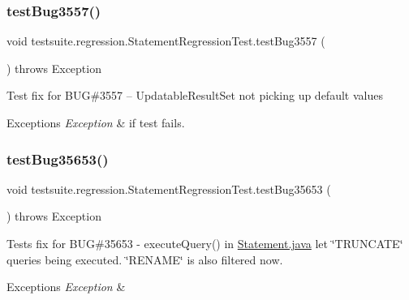 \subsubsection{\texorpdfstring{test\+Bug3557()}{testBug3557()}}
{\footnotesize\ttfamily void testsuite.\+regression.\+Statement\+Regression\+Test.\+test\+Bug3557 (\begin{DoxyParamCaption}{ }\end{DoxyParamCaption}) throws Exception}

Test fix for B\+UG\#3557 -- Updatable\+Result\+Set not picking up default values


\begin{DoxyExceptions}{Exceptions}
{\em Exception} & if test fails. \\
\hline
\end{DoxyExceptions}
\mbox{\label{classtestsuite_1_1regression_1_1_statement_regression_test_a40b2d7e9258863dc6ad385628b08e04d}} 
\subsubsection{\texorpdfstring{test\+Bug35653()}{testBug35653()}}
{\footnotesize\ttfamily void testsuite.\+regression.\+Statement\+Regression\+Test.\+test\+Bug35653 (\begin{DoxyParamCaption}{ }\end{DoxyParamCaption}) throws Exception}

Tests fix for B\+UG\#35653 -\/ execute\+Query() in \mbox{\hyperlink{_statement_8java}{Statement.\+java}} let \char`\"{}\+T\+R\+U\+N\+C\+A\+T\+E\char`\"{} queries being executed. \char`\"{}\+R\+E\+N\+A\+M\+E\char`\"{} is also filtered now.


\begin{DoxyExceptions}{Exceptions}
{\em Exception} & \\
\hline
\end{DoxyExceptions}
\mbox{\label{classtestsuite_1_1regression_1_1_statement_regression_test_ae6669fb30d9e776b85809dd115147654}} 
